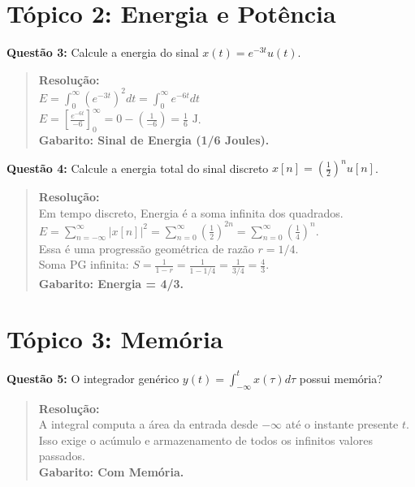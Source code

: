 \section{Tópico 2: Energia e Potência}\label{tuxf3pico-2-energia-e-potuxeancia}

\textbf{Questão 3:} Calcule a energia do sinal \(x(t) = e^{-3t}u(t)\).

\begin{quote}
\textbf{Resolução:}\\
\(E = \int_{0}^{\infty} (e^{-3t})^2 dt = \int_{0}^{\infty} e^{-6t} dt\)\\
\(E = \left[ \frac{e^{-6t}}{-6} \right]_0^\infty = 0 - \left( \frac{1}{-6} \right) = \frac{1}{6} \text{ J}\).\\
\textbf{Gabarito: Sinal de Energia (1/6 Joules).}
\end{quote}

\textbf{Questão 4:} Calcule a energia total do sinal discreto \(x[n] = (\frac{1}{2})^n u[n]\).

\begin{quote}
\textbf{Resolução:}\\
Em tempo discreto, Energia é a soma infinita dos quadrados.\\
\(E = \sum_{n=-\infty}^{\infty} |x[n]|^2 = \sum_{n=0}^{\infty} \left( \frac{1}{2} \right)^{2n} = \sum_{n=0}^{\infty} \left( \frac{1}{4} \right)^n\).\\
Essa é uma progressão geométrica de razão \(r = 1/4\).\\
Soma PG infinita: \(S = \frac{1}{1 - r} = \frac{1}{1 - 1/4} = \frac{1}{3/4} = \frac{4}{3}\).\\
\textbf{Gabarito: Energia = 4/3.}
\end{quote}

\section{Tópico 3: Memória}\label{tuxf3pico-3-memuxf3ria}

\textbf{Questão 5:} O integrador genérico \(y(t) = \int_{-\infty}^{t} x(\tau) d\tau\) possui memória?

\begin{quote}
\textbf{Resolução:}\\
A integral computa a área da entrada desde \(-\infty\) até o instante presente \(t\). Isso exige o acúmulo e armazenamento de todos os infinitos valores passados.\\
\textbf{Gabarito: Com Memória.}
\end{quote}

